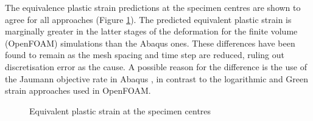 \documentclass[sn-mathphys,Numbered,draft]{sn-jnl}%
\begin{document}
The equivalence plastic strain predictions at the specimen centres are shown to agree for all approaches (Figure \ref{fig:eqPlasticStrainPlasticity}).
The predicted equivalent plastic strain is marginally greater in the latter stages of the deformation for the finite volume (OpenFOAM) simulations than the Abaqus ones.
These differences have been found to remain as the mesh spacing and time step are reduced, ruling out discretisation error as the cause.
A possible reason for the difference is the use of the Jaumann objective rate in Abaqus \cite{soyarslan_finite_2010}, in contrast to the logarithmic and Green strain approaches used in OpenFOAM.
\begin{figure}[htbp]
	\centering
	\caption{Equivalent plastic strain at the specimen centres}
	\label{fig:eqPlasticStrainPlasticity}
\end{figure}
\end{document}
